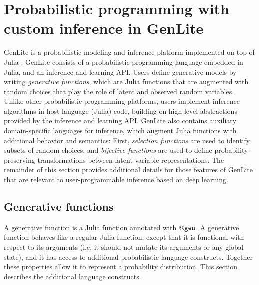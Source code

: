 \section{Probabilistic programming with custom inference in GenLite}

GenLite is a probabilistic modeling and inference platform implemented on top of Julia \cite{?}.
GenLite consists of a probabilistic programming language embedded in Julia, and an inference and learning API.
Users define generative models by writing \emph{generative functions}, which are Julia functions that are augmented with random choices that play the role of latent and observed random variables.
Unlike other probabilistic programming platforms, users implement inference algorithms in host language (Julia) code, building on high-level abstractions provided by the inference and learning API.
GenLite also contains auxiliary domain-specific languages for inference, which augment Julia functions with additional behavior and semantics:
First, \emph{selection functions} are used to identify subsets of random choices, and \emph{bijective functions} are used to define probability-preserving transformations between latent variable representations.
The remainder of this section provides additional details for those features of GenLite that are relevant to user-programmable inference based on deep learning.

\subsection{Generative functions}

A generative function is a Julia function annotated with $\mathtt{@gen}{}$.
A generative function behaves like a regular Julia function, except that it is functional with respect to its arguments (i.e. it should not mutate its arguments or any global state), and it has access to additional probabilistic language constructs.
Together these properties allow it to represent a probability distribution.
This section describes the additional language constructs.

